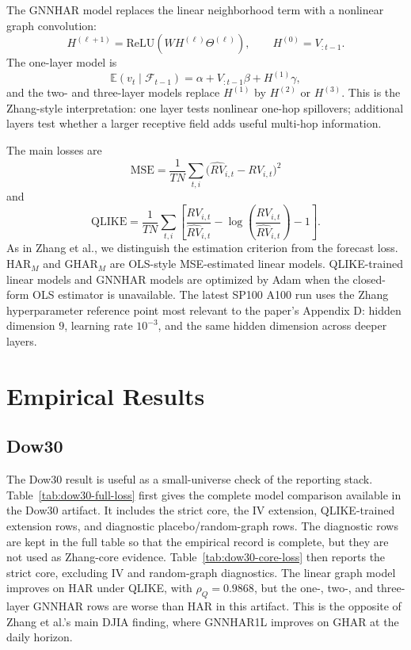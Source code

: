 \documentclass[11pt]{article}
\begin{document}
The GNNHAR model replaces the linear neighborhood term with a nonlinear graph convolution:
\[
  H^{(\ell+1)}
  =
  \mathrm{ReLU}\!\left(W H^{(\ell)}\Theta^{(\ell)}\right),
  \qquad
  H^{(0)} = V_{:t-1}.
\]
The one-layer model is
\[
  \mathbb{E}(v_t\mid \mathcal{F}_{t-1})
  =
  \alpha + V_{:t-1}\beta + H^{(1)}\gamma,
\]
and the two- and three-layer models replace \(H^{(1)}\) by \(H^{(2)}\) or \(H^{(3)}\).
This is the Zhang-style interpretation: one layer tests nonlinear one-hop spillovers; additional layers test whether a larger receptive field adds useful multi-hop information.

The main losses are
\[
  \mathrm{MSE}
  =
  \frac{1}{TN}\sum_{t,i}
  \bigl(\widehat{RV}_{i,t}-RV_{i,t}\bigr)^2
\]
and
\[
  \mathrm{QLIKE}
  =
  \frac{1}{TN}\sum_{t,i}
  \left[
    \frac{RV_{i,t}}{\widehat{RV}_{i,t}}
    -
    \log\!\left(\frac{RV_{i,t}}{\widehat{RV}_{i,t}}\right)
    -
    1
  \right].
\]
As in Zhang et al., we distinguish the estimation criterion from the forecast loss.
\(\mathrm{HAR}_M\) and \(\mathrm{GHAR}_M\) are OLS-style MSE-estimated linear models.
QLIKE-trained linear models and GNNHAR models are optimized by Adam when the closed-form OLS estimator is unavailable.
The latest SP100 A100 run uses the Zhang hyperparameter reference point most relevant to the paper's Appendix D: hidden dimension \(9\), learning rate \(10^{-3}\), and the same hidden dimension across deeper layers.

\section{Empirical Results}

\subsection{Dow30}

The Dow30 result is useful as a small-universe check of the reporting stack.
Table~\ref{tab:dow30-full-loss} first gives the complete model comparison available in the Dow30 artifact.
It includes the strict core, the IV extension, QLIKE-trained extension rows, and diagnostic placebo/random-graph rows.
The diagnostic rows are kept in the full table so that the empirical record is complete, but they are not used as Zhang-core evidence.
Table~\ref{tab:dow30-core-loss} then reports the strict core, excluding IV and random-graph diagnostics.
The linear graph model improves on HAR under QLIKE, with \(\rho_Q=0.9868\), but the one-, two-, and three-layer GNNHAR rows are worse than HAR in this artifact.
This is the opposite of Zhang et al.'s main DJIA finding, where GNNHAR1L improves on GHAR at the daily horizon.
\end{document}
